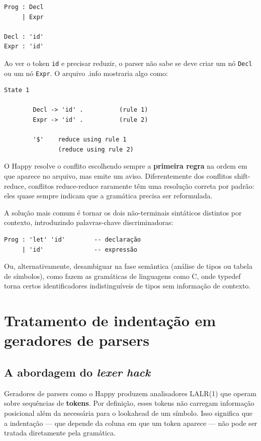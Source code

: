 \begin{verbatim}
Prog : Decl
     | Expr

Decl : 'id'
Expr : 'id'
\end{verbatim}

Ao ver o token \verb|id| e precisar reduzir, o
parser não sabe se deve criar um nó \verb|Decl| ou
um nó \verb|Expr|. O arquivo
.info mostraria algo como:

\begin{verbatim}
State 1

        Decl -> 'id' .          (rule 1)
        Expr -> 'id' .          (rule 2)

        '$'    reduce using rule 1
               (reduce using rule 2)
\end{verbatim}

O Happy resolve o conflito escolhendo sempre a \textbf{primeira
regra} na ordem em que aparece no arquivo, mas emite um aviso.
Diferentemente dos conflitos shift-reduce, conflitos reduce-reduce
raramente têm uma resolução correta por padrão: eles quase sempre
indicam que a gramática precisa ser reformulada.

A solução mais comum é tornar os dois não-terminais sintáticos
distintos por contexto, introduzindo palavras-chave discriminadoras:

\begin{verbatim}
Prog : 'let' 'id'        -- declaração
     | 'id'              -- expressão
\end{verbatim}

Ou, alternativamente, desambiguar na fase semântica (análise de tipos
ou tabela de símbolos), como fazem as gramáticas de linguagens como
C, onde typedef torna certos
identificadores indistinguíveis de tipos sem informação de contexto.

\section{Tratamento de indentação em geradores de parsers}

\subsection{A abordagem do \emph{lexer hack}}

Geradores de parsers como o Happy produzem analisadores LALR(1) que
operam sobre sequências de \textbf{tokens}. Por definição, esses
tokens não carregam informação posicional além da necessária para
o lookahead de um símbolo. Isso significa que a indentação --- que
depende da coluna em que um token aparece --- não pode ser tratada
diretamente pela gramática.

